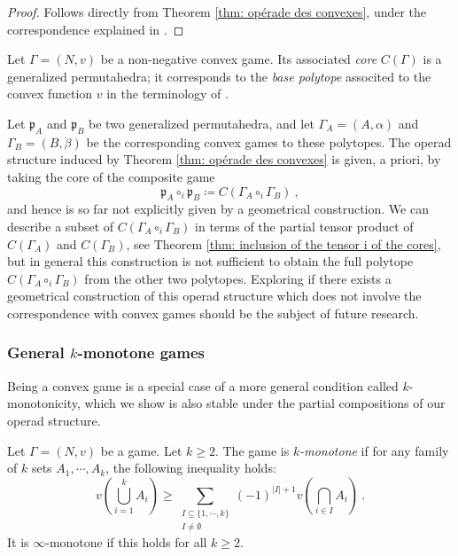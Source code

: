 \documentclass[a4paper,12pt]{amsart}
\begin{document}
\begin{proof}
Follows directly from Theorem \ref{thm: opérade des convexes}, under the correspondence explained in \cite[Section 12]{AguiarArdila}. 
\end{proof}

\begin{remark} Let $\Gamma = (N,v)$ be a non-negative convex game. Its associated \textit{core} $C(\Gamma)$ is a generalized permutahedra; it corresponds to the \textit{base polytope} associted to the convex function $v$ in the terminology of \cite[Section 12.3]{AguiarArdila}. 

\medskip

Let $\mathfrak{p}_A$ and $\mathfrak{p}_B$ be two generalized permutahedra, and let \(\Gamma_A = (A, \alpha) \) and \(\Gamma_B = (B, \beta)\) be the corresponding convex games to these polytopes. The operad structure induced by Theorem \ref{thm: opérade des convexes} is given, a priori, by taking the core of the composite game
\[
\mathfrak{p}_A \circ_i \mathfrak{p}_B \coloneqq C(\Gamma_A \circ_i \Gamma_B)~,
\]
and hence is so far not explicitly given by a geometrical construction. We can describe a subset of $C(\Gamma_A \circ_i \Gamma_B)$ in terms of the partial tensor product of $C(\Gamma_A)$ and $C(\Gamma_B)$, see Theorem \ref{thm: inclusion of the tensor i of the cores}, but in general this construction is not sufficient to obtain the full polytope $C(\Gamma_A \circ_i \Gamma_B)$ from the other two polytopes. Exploring if there exists a geometrical construction of this operad structure which does not involve the correspondence with convex games should be the subject of future research.  
\end{remark}

\subsubsection{General $k$-monotone games} Being a convex game is a special case of a more general condition called $k$-monotonicity, which we show is also stable under the partial compositions of our operad structure. 

\begin{definition}
Let $\Gamma = (N,v)$ be a game. Let $k \geq 2$. The game is $k$\textit{-monotone} if for any family of $k$ sets $A_1, \cdots, A_k$, the following inequality holds: 
\[
v\left(\bigcup_{i=1}^k A_i \right) \geq \sum_{\substack{I \subseteq \{1,\cdots,k\}\\ I \neq \emptyset}} (-1)^{|I|+1} v\left(\bigcap_{i\in I} A_i\right)~. 
\]
It is $\infty$-monotone if this holds for all $k \geq 2$. 
\end{definition}
\end{document}
